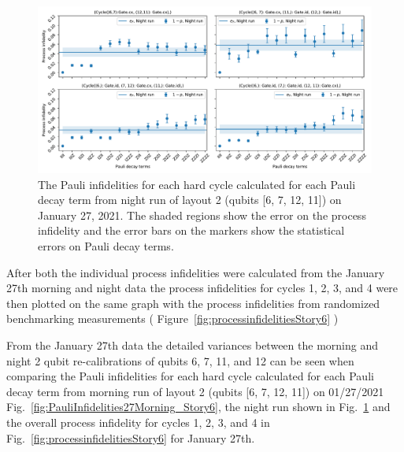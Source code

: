 \begin{figure}[htpb]
    \includegraphics[scale=0.56]{CBPauliInfidelities_27_01_2021_NightRun_Layout2_Cycle1_2_3_4.pdf}
    \caption{The Pauli infidelities for each hard cycle calculated for each Pauli decay term from night run of layout 2 (qubits [6, 7, 12, 11]) on January 27, 2021. The shaded regions show the error on the process infidelity and the error bars on the markers show the statistical errors on Pauli decay terms. }
    \label{fig:PauliInfidelities27Night_Story6}
\end{figure}
 
After both the individual process infidelities were calculated from the January 27th morning and night data the process infidelities for cycles 1, 2, 3, and 4 were then plotted on the same graph with the process infidelities from randomized benchmarking measurements ( Figure~\ref{fig:processinfidelitiesStory6} )

From the January 27th data the detailed variances between the morning and night 2 qubit re-calibrations of qubits 6, 7, 11, and 12 can be seen when comparing the Pauli infidelities for each hard cycle calculated for each Pauli decay term from morning run of layout 2 (qubits [6, 7, 12, 11]) on 01/27/2021 
Fig.~\ref{fig:PauliInfidelities27Morning_Story6}, 
the night run shown in Fig.~\ref{fig:PauliInfidelities27Night_Story6} 
and the overall process infidelity for cycles 1, 2, 3, and 4 in Fig.~\ref{fig:processinfidelitiesStory6} for January 27th.


